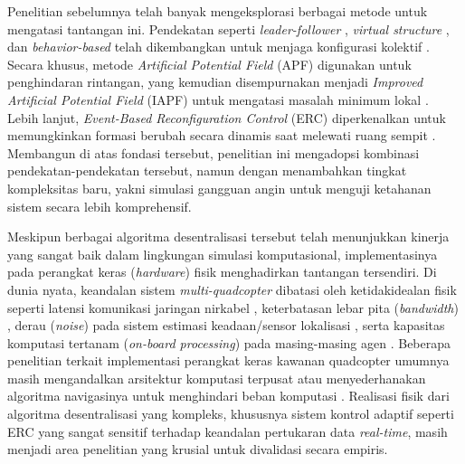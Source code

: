 \documentclass[12pt,a4paper]{report}
\numberwithin{equation}{chapter}
\begin{document}
Penelitian sebelumnya telah banyak mengeksplorasi berbagai metode untuk mengatasi tantangan ini. Pendekatan seperti \textit{leader-follower} \cite{abroComprehensiveReviewNextGen2025}, \textit{virtual structure} \cite{renFormationFeedbackControl2004, liuDecentralizationVirtualLinkage2018}, dan \textit{behavior-based} telah dikembangkan untuk menjaga konfigurasi kolektif \cite{balchBehaviorbasedFormationControl1998}. Secara khusus, metode \textit{Artificial Potential Field} (APF) digunakan untuk penghindaran rintangan, yang kemudian disempurnakan menjadi \textit{Improved Artificial Potential Field} (IAPF) untuk mengatasi masalah minimum lokal \cite{wangUAVFormationObstacle2021, buiEventbasedReconfigurationControl2025}. Lebih lanjut, \textit{Event-Based Reconfiguration Control} (ERC) diperkenalkan untuk memungkinkan formasi berubah secara dinamis saat melewati ruang sempit \cite{buiEventbasedReconfigurationControl2025}. Membangun di atas fondasi tersebut, penelitian ini mengadopsi kombinasi pendekatan-pendekatan tersebut, namun dengan menambahkan tingkat kompleksitas baru, yakni simulasi gangguan angin untuk menguji ketahanan sistem secara lebih komprehensif.

Meskipun berbagai algoritma desentralisasi tersebut telah menunjukkan kinerja yang sangat baik dalam lingkungan simulasi komputasional, implementasinya pada perangkat keras (\textit{hardware}) fisik menghadirkan tantangan tersendiri. Di dunia nyata, keandalan sistem \textit{multi-quadcopter} dibatasi oleh ketidakidealan fisik seperti latensi komunikasi jaringan nirkabel \cite{chenReviewUnmannedAerial2020}, keterbatasan lebar pita (\textit{bandwidth}) \cite{baktayanComputationalOffloadingUAV2024}, derau (\textit{noise}) pada sistem estimasi keadaan/sensor lokalisasi \cite{georgiadisReviewLocalizationSensing2025, liuSurveySensorsBased2025}, serta kapasitas komputasi tertanam (\textit{on-board processing}) pada masing-masing agen \cite{ahmedSurveyUAVComputing2022}. Beberapa penelitian terkait implementasi perangkat keras kawanan quadcopter umumnya masih mengandalkan arsitektur komputasi terpusat atau menyederhanakan algoritma navigasinya untuk menghindari beban komputasi \cite{alqudsiUAVSwarmsResearch2025}. Realisasi fisik dari algoritma desentralisasi yang kompleks, khususnya sistem kontrol adaptif seperti ERC yang sangat sensitif terhadap keandalan pertukaran data \textit{real-time}, masih menjadi area penelitian yang krusial untuk divalidasi secara empiris.
\end{document}
